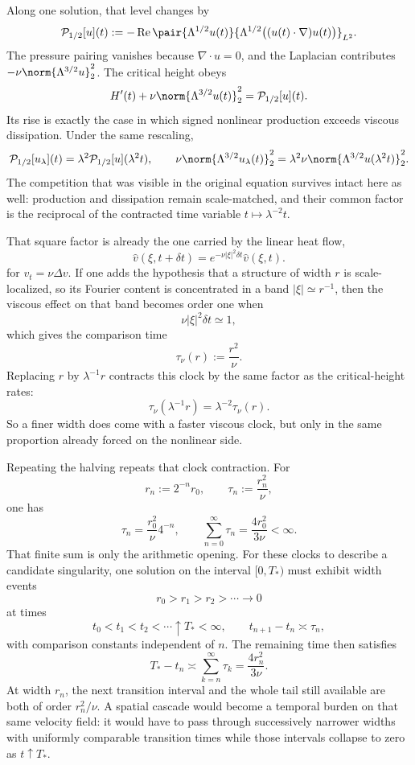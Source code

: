 
Along one solution, that level changes by
\[
  \mathcal P_{1/2}[u](t)
  :=
  -\operatorname{Re}
  \pair
    {\Lambda^{1/2}u(t)}
    {\Lambda^{1/2}\bigl((u(t)\cdot\nabla)u(t)\bigr)}_{L^2}.
\]
The pressure pairing vanishes because \(\nabla\cdot u=0\), and the Laplacian contributes \(-\nu\norm{\Lambda^{3/2}u}_2^2\). The critical height obeys
\[
  H'(t)
  +
  \nu\norm{\Lambda^{3/2}u(t)}_2^2
  =
  \mathcal P_{1/2}[u](t).
\]
Its rise is exactly the case in which signed nonlinear production exceeds viscous dissipation. Under the same rescaling,
\[
  \mathcal P_{1/2}[u_\lambda](t)
  =
  \lambda^2\mathcal P_{1/2}[u](\lambda^2t),
  \qquad
  \nu\norm{\Lambda^{3/2}u_\lambda(t)}_2^2
  =
  \lambda^2\nu\norm{\Lambda^{3/2}u(\lambda^2t)}_2^2.
\]
The competition that was visible in the original equation survives intact here as well: production and dissipation remain scale-matched, and their common factor is the reciprocal of the contracted time variable \(t\mapsto\lambda^{-2}t\).


That square factor is already the one carried by the linear heat flow,
\[
  \widehat v(\xi,t+\delta t)
  =
  e^{-\nu|\xi|^2\delta t}\widehat v(\xi,t).
\]
for \(v_t=\nu\Delta v\). If one adds the hypothesis that a structure of width \(r\) is scale-localized, so its Fourier content is concentrated in a band \(|\xi|\simeq r^{-1}\), then the viscous effect on that band becomes order one when
\[
  \nu|\xi|^2\delta t\simeq1,
\]
which gives the comparison time
\[
  \tau_\nu(r)
  :=
  \frac{r^2}{\nu}.
\]
Replacing \(r\) by \(\lambda^{-1}r\) contracts this clock by the same factor as the critical-height rates:
\[
  \tau_\nu(\lambda^{-1}r)
  =
  \lambda^{-2}\tau_\nu(r).
\]
So a finer width does come with a faster viscous clock, but only in the same proportion already forced on the nonlinear side.


Repeating the halving repeats that clock contraction. For
\[
  r_n:=2^{-n}r_0,
  \qquad
  \tau_n:=\frac{r_n^2}{\nu},
\]
one has
\[
  \tau_n
  =
  \frac{r_0^2}{\nu}4^{-n},
  \qquad
  \sum_{n=0}^{\infty}\tau_n
  =
  \frac{4r_0^2}{3\nu}
  <
  \infty.
\]
That finite sum is only the arithmetic opening. For these clocks to describe a candidate singularity, one \NavierStokes{} solution on the interval \([0,T_*)\) must exhibit width events
\[
  r_0>r_1>r_2>\cdots\longrightarrow0
\]
at times
\[
  t_0<t_1<t_2<\cdots\uparrow T_*<\infty,
  \qquad
  t_{n+1}-t_n\asymp\tau_n,
\]
with comparison constants independent of \(n\). The remaining time then satisfies
\[
  T_*-t_n
  \asymp
  \sum_{k=n}^{\infty}\tau_k
  =
  \frac{4r_n^2}{3\nu}.
\]
At width \(r_n\), the next transition interval and the whole tail still available are both of order \(r_n^2/\nu\). A spatial cascade would become a temporal burden on that same velocity field: it would have to pass through successively narrower widths with uniformly comparable transition times while those intervals collapse to zero as \(t\uparrow T_*\).
